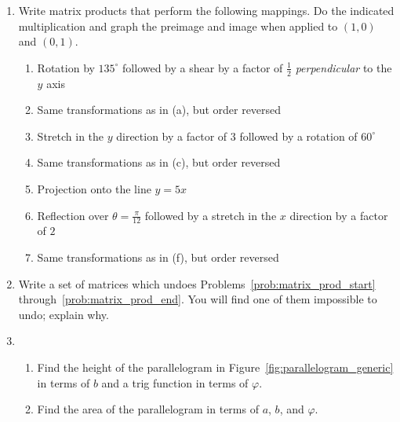 \documentclass[../textbook.tex]{subfiles}
\begin{document}
\begin{enumerate}
\item Write matrix products that perform the following mappings. Do the indicated multiplication and graph the preimage and image when applied to $(1,0)$ and $(0,1)$.
\begin{enumerate}
\item Rotation by $135^\circ$ followed by a shear by a factor of $\frac{1}{2}$ \textit{perpendicular} to the $y$ axis \label{prob:matrix_prod_start}
\item Same transformations as in (a), but order reversed
\item Stretch in the $y$ direction by a factor of $3$ followed by a rotation of $60^\circ$
\item Same transformations as in (c), but order reversed
\item Projection onto the line $y=5x$
\item Reflection over $\theta=\frac{\pi}{12}$ followed by a stretch in the $x$ direction by a factor of $2$
\item Same transformations as in (f), but order reversed \label{prob:matrix_prod_end}
\end{enumerate}
\item Write a set of matrices which undoes Problems~\ref{prob:matrix_prod_start} through~\ref{prob:matrix_prod_end}. You will find one of them impossible to undo; explain why.
\item \begin{enumerate}
\item Find the height of the parallelogram in Figure~\ref{fig:parallelogram_generic} in terms of $b$ and a trig function in terms of $\varphi$.
\item Find the area of the parallelogram in terms of $a$, $b$, and $\varphi$.
\end{enumerate}
\setcounter{problem_i}{\value{enumi}}
\end{enumerate}
\end{document}
